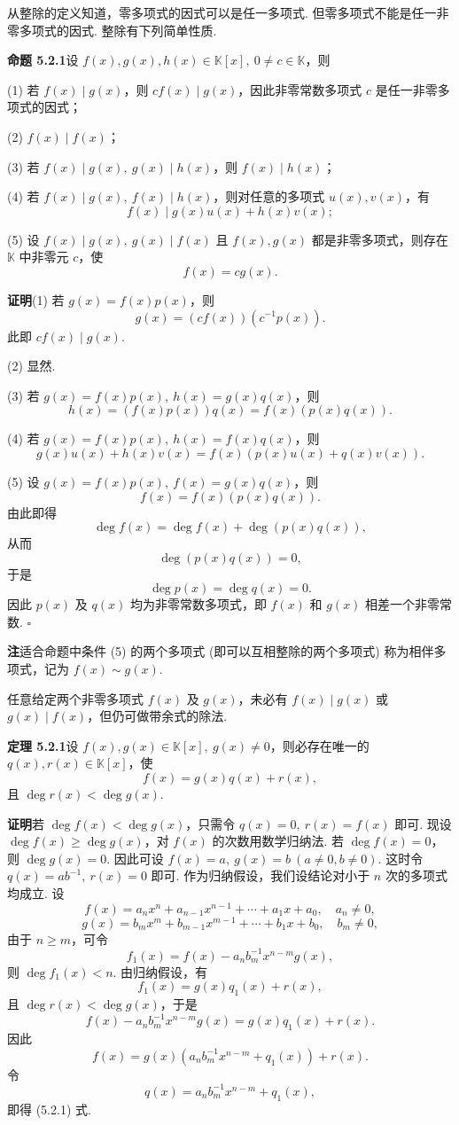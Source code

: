 \documentclass[UTF8,12pt,a4paper,fontset=fandol]{ctexart}
\begin{document}
从整除的定义知道，零多项式的因式可以是任一多项式. 但零多项式不能是任一非零多项式的因式. 整除有下列简单性质.

\noindent\textbf{命题 5.2.1}\quad 设 $f(x),g(x),h(x)\in\mathbb{K}[x],\ 0\neq c\in\mathbb{K}$，则

(1) 若 $f(x)\mid g(x)$，则 $cf(x)\mid g(x)$，因此非零常数多项式 $c$ 是任一非零多项式的因式；

(2) $f(x)\mid f(x)$；

(3) 若 $f(x)\mid g(x),\ g(x)\mid h(x)$，则 $f(x)\mid h(x)$；

(4) 若 $f(x)\mid g(x),\ f(x)\mid h(x)$，则对任意的多项式 $u(x),v(x)$，有
\[
f(x)\mid g(x)u(x)+h(x)v(x);
\]

(5) 设 $f(x)\mid g(x),\ g(x)\mid f(x)$ 且 $f(x),g(x)$ 都是非零多项式，则存在 $\mathbb{K}$ 中非零元 $c$，使
\[
f(x)=cg(x).
\]

\noindent\textbf{证明}\quad (1) 若 $g(x)=f(x)p(x)$，则
\[
g(x)=(cf(x))(c^{-1}p(x)).
\]
此即 $cf(x)\mid g(x)$.

(2) 显然.

(3) 若 $g(x)=f(x)p(x),\ h(x)=g(x)q(x)$，则
\[
h(x)=(f(x)p(x))q(x)=f(x)(p(x)q(x)).
\]

(4) 若 $g(x)=f(x)p(x),\ h(x)=f(x)q(x)$，则
\[
g(x)u(x)+h(x)v(x)=f(x)(p(x)u(x)+q(x)v(x)).
\]

(5) 设 $g(x)=f(x)p(x),\ f(x)=g(x)q(x)$，则
\[
f(x)=f(x)(p(x)q(x)).
\]
由此即得
\[
\deg f(x)=\deg f(x)+\deg(p(x)q(x)),
\]
从而
\[
\deg(p(x)q(x))=0,
\]
于是
\[
\deg p(x)=\deg q(x)=0.
\]
因此 $p(x)$ 及 $q(x)$ 均为非零常数多项式，即 $f(x)$ 和 $g(x)$ 相差一个非零常数. $\square$

\noindent\textbf{注}\quad 适合命题中条件 (5) 的两个多项式 (即可以互相整除的两个多项式) 称为相伴多项式，记为 $f(x)\sim g(x)$.

任意给定两个非零多项式 $f(x)$ 及 $g(x)$，未必有 $f(x)\mid g(x)$ 或 $g(x)\mid f(x)$，但仍可做带余式的除法.

\noindent\textbf{定理 5.2.1}\quad 设 $f(x),g(x)\in\mathbb{K}[x],\ g(x)\neq 0$，则必存在唯一的 $q(x),r(x)\in\mathbb{K}[x]$，使
\begin{equation}
f(x)=g(x)q(x)+r(x),
\tag{5.2.1}
\end{equation}
且 $\deg r(x)<\deg g(x)$.

\noindent\textbf{证明}\quad 若 $\deg f(x)<\deg g(x)$，只需令 $q(x)=0,\ r(x)=f(x)$ 即可.
现设 $\deg f(x)\geq \deg g(x)$，对 $f(x)$ 的次数用数学归纳法. 若 $\deg f(x)=0$，则 $\deg g(x)=0$. 因此可设 $f(x)=a,\ g(x)=b\ (a\neq 0,b\neq 0)$. 这时令 $q(x)=ab^{-1},\ r(x)=0$ 即可. 作为归纳假设，我们设结论对小于 $n$ 次的多项式均成立. 设
\[
f(x)=a_nx^n+a_{n-1}x^{n-1}+\cdots+a_1x+a_0,\quad a_n\neq 0,
\]
\[
g(x)=b_mx^m+b_{m-1}x^{m-1}+\cdots+b_1x+b_0,\quad b_m\neq 0,
\]
由于 $n\geq m$，可令
\[
f_1(x)=f(x)-a_nb_m^{-1}x^{n-m}g(x),
\]
则 $\deg f_1(x)<n$. 由归纳假设，有
\[
f_1(x)=g(x)q_1(x)+r(x),
\]
且 $\deg r(x)<\deg g(x)$，于是
\[
f(x)-a_nb_m^{-1}x^{n-m}g(x)=g(x)q_1(x)+r(x).
\]
因此
\[
f(x)=g(x)(a_nb_m^{-1}x^{n-m}+q_1(x))+r(x).
\]
令
\[
q(x)=a_nb_m^{-1}x^{n-m}+q_1(x),
\]
即得 (5.2.1) 式.
\end{document}
